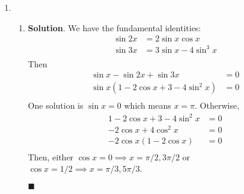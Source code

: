 \documentclass[12pt]{article}
\newenvironment*{sol}{\par \textbf{Solution}.}{\hfill$\blacksquare$}
\begin{document}
\begin{enumerate}
\begin{sol}
\begin{align*}
            \end{align*}
            If $2a=-3b$, we have \begin{align*}
                -12b+9b+6&=0\\
                b=-2 &,a=3
            \end{align*}
            Then $a=-\dfrac{3}{7}$ or $a=3$.
        \end{sol}
        \item \begin{enumerate}
            \item \begin{sol}
                We have the fundamental identities:\begin{align*}
                    \sin{2x}&=2\sin{x}\cos{x}\\
                    \sin{3x}&=3\sin{x}-4\sin^3{x}\\
                \end{align*}
                Then \begin{align*}
                    \sin{x}-\sin{2x}+\sin{3x}&=0\\
                    \sin{x}(1-2\cos{x}+3-4\sin^2{x})&=0\\
                \end{align*}
                One solution is $\sin{x}=0$ which means $x=\pi$. Otherwise,\begin{align*}
                    1-2\cos{x}+3-4\sin^2{x}&=0\\
                    -2\cos{x}+4\cos^2{x}&=0\\
                    -2\cos{x}(1-2\cos{x})&=0\\
                \end{align*}
                Then, either $\cos{x}=0\implies x=\pi/2,3\pi/2$ or $\cos{x}=1/2\implies x=\pi/3,5\pi/3$.


\end{sol}
\end{enumerate}
\end{enumerate}
\end{document}
